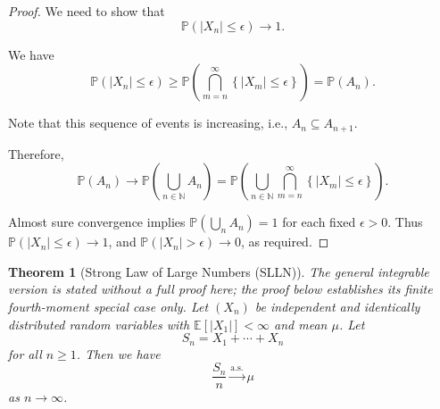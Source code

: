 \documentclass[11pt]{article}
\numberwithin{equation}{section}
\newtheorem{theorem}{Theorem}[section]
\theoremstyle{definition}
\theoremstyle{remark}
\newcommand{\pqty}[1]{\left(#1\right)}
\newcommand{\Bqty}[1]{\left\{#1\right\}}
\newcommand{\abs}[1]{\left|#1\right|}
\newcommand{\NN}{\mathbb N}
\newcommand{\Prob}{\mathbb P}
\newcommand{\Expt}{\mathbb E}
\newcommand{\toAlmostSure}{\xrightarrow{\mathrm{a.s.}}}
\begin{document}
\begin{proof}\label{probability-proof-090}
    We need to show that
    \[
        \Prob\pqty{\abs{X_n} \leq \epsilon} \to 1.
    \]

    We have
    \[
        \Prob\pqty{\abs{X_n} \leq \epsilon} \geq \Prob\pqty{\bigcap_{m = n}^{\infty} \Bqty{\abs{X_m} \leq \epsilon}} = \Prob\pqty{A_n}.
    \]

    Note that this sequence of events is increasing, i.e., \(A_n \subseteq A_{n + 1}\).

    Therefore,
    \[
        \Prob\pqty{A_n} \to \Prob\pqty{\bigcup_{n \in \NN} A_n} = \Prob\pqty{\bigcup_{n \in \NN} \bigcap_{m = n}^{\infty} \Bqty{\abs{X_m} \leq \epsilon}}.
    \]  

    Almost sure convergence implies \(\Prob(\bigcup_n A_n)=1\) for
    each fixed \(\epsilon>0\). Thus \(\Prob(|X_n|\le\epsilon)\to1\), and
    \(\Prob(|X_n|>\epsilon)\to0\), as required.
\end{proof}

\begin{theorem}[Strong Law of Large Numbers (SLLN)]\label{probability-theorem-026}
    \label{probability-thm:strong-law-of-large-numbers}
The general integrable version is stated without a full proof here; the proof below establishes its finite fourth-moment special case only.
%
    Let \(\pqty{X_n}\) be independent and identically distributed random variables with \(\Expt[|X_1|]<\infty\) and mean \(\mu\). Let
    \[
        S_n = X_1 + \cdots + X_n
    \]
    for all \(n \geq 1\). Then we have
    \[
        \frac{S_n}{n} \toAlmostSure \mu
    \]
    as \(n \to \infty\).
\end{theorem}
\end{document}

